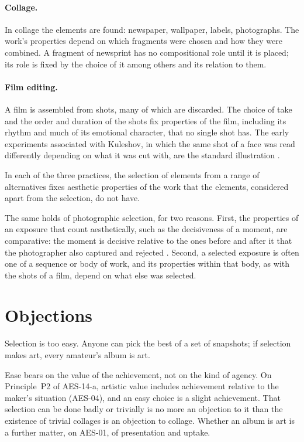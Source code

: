 \documentclass{situationist-preprint}
\begin{document}
\paragraph{Collage.} In collage the elements are found: newspaper, wallpaper, labels, photographs. The work's properties depend on which fragments were chosen and how they were combined. A fragment of newsprint has no compositional role until it is placed; its role is fixed by the choice of it among others and its relation to them.

\paragraph{Film editing.} A film is assembled from shots, many of which are discarded. The choice of take and the order and duration of the shots fix properties of the film, including its rhythm and much of its emotional character, that no single shot has. The early experiments associated with Kuleshov, in which the same shot of a face was read differently depending on what it was cut with, are the standard illustration \citep{Bordwell1985}.

\begin{proposition}\label{p:sel}
In each of the three practices, the selection of elements from a range of alternatives fixes aesthetic properties of the work that the elements, considered apart from the selection, do not have.
\end{proposition}

The same holds of photographic selection, for two reasons. First, the properties of an exposure that count aesthetically, such as the decisiveness of a moment, are comparative: the moment is decisive relative to the ones before and after it that the photographer also captured and rejected \citep{CartierBresson1952}. Second, a selected exposure is often one of a sequence or body of work, and its properties within that body, as with the shots of a film, depend on what else was selected.

\section{Objections}

\begin{objection}
Selection is too easy. Anyone can pick the best of a set of snapshots; if selection makes art, every amateur's album is art.
\end{objection}

\begin{reply}
Ease bears on the value of the achievement, not on the kind of agency. On Principle~P2 of AES-14-a, artistic value includes achievement relative to the maker's situation (AES-04), and an easy choice is a slight achievement. That selection can be done badly or trivially is no more an objection to it than the existence of trivial collages is an objection to collage. Whether an album is art is a further matter, on AES-01, of presentation and uptake.
\end{reply}
\end{document}
